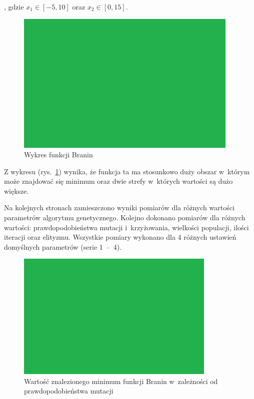 \documentclass[11pt, a4paper]{article}
\newcommand{\fbi}{\leavevmode{\parindent=1em\indent}}
\begin{document}
, gdzie $ x_1 \in [-5, 10] $ oraz $ x_2 \in [0, 15] $.

\begin{figure}[H]
	\centering
	\includegraphics[width=0.95\textwidth]{./assets/test.png}
	\caption{Wykres funkcji Branin}
	\label{fig:branin1}
\end{figure}

\fbi
Z wykresu (rys.~\ref{fig:branin1}) wynika, że funkcja ta ma stosunkowo duży obszar w~którym może znajdować się minimum oraz dwie strefy w~których wartości są dużo większe.

\fbi
Na kolejnych stronach zamieszczono wyniki pomiarów dla różnych wartości parametrów algorytmu genetycznego. Kolejno dokonano pomiarów dla różnych wartości: prawdopodobieństwa mutacji i~krzyżowania, wielkości populacji, ilości iteracji oraz elityzmu. Wszystkie pomiary wykonano dla 4 różnych ustawień domyślnych parametrów (serie 1~--~4).

\newpage
\begin{figure}[H]
	\centering
	\includegraphics[width=0.85\textwidth]{./assets/test.png}
	\caption{Wartość znalezionego minimum funkcji Branin w~zależności od prawdopodobieństwa mutacji}
	\label{fig:branin2}
\end{figure}
\end{document}
